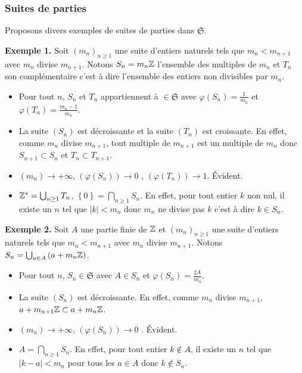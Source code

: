 \subsubsection{Suites de parties}\label{ExplesSuitesCongru}
Proposons divers exemples de suites de parties dans $\mathfrak{S}$.

\textbf{Exemple 1.}\newline
Soit  $(m_n)_{n\geq 1}$ une suite d'entiers naturels tels que $m_n < m_{n+1}$ avec $m_n$ divise $m_{n+1}$.\newline
Notons $S_n = m_n \mathbb{Z}$ l'ensemble des multiples de $m_n$ et $T_n$ son complémentaire c'est à dire l'ensemble des entiers non divisibles par $m_n$.
 \begin{itemize}
  \item Pour tout $n$, $S_n$ et $T_n$ appartiennent à $\in \mathfrak{S}$ avec $\varphi(S_n)=\frac{1}{m_n}$ et $\varphi(T_n)=\frac{m_n-1}{m_n}$.
  \item La suite $(S_n)$ est décroissante et la suite $(T_n)$ est croissante. En effet, comme $m_n$ divise $m_{n+1}$, tout multiple de $m_{n+1}$ est un multiple de $m_{n}$ donc $S_{n+1} \subset S_{n}$ et $T_n \subset T_{n+1}$.
  \item $(m_n) \rightarrow + \infty$, $(\varphi(S_n)) \rightarrow 0$ , $(\varphi(T_n)) \rightarrow 1$. Évident.
  \item $\mathbb{Z}^* = \bigcup_{n\geq 1} T_n$, $\left\lbrace 0 \right\rbrace = \bigcap_{n\geq 1} S_n$. En effet, pour tout entier $k$ non nul, il existe un $n$ tel que $|k| < m_n$ donc $m_n$ ne divise pas $k$ c'est à dire $k \in S_n$.
 \end{itemize}

\textbf{Exemple 2.}\newline
Soit  $A$ une partie finie de $\mathbb{Z}$ et $(m_n)_{n\geq 1}$ une suite d'entiers naturels tels que $m_n < m_{n+1}$ avec $m_n$ divise $m_{n+1}$.\newline
Notons $S_n = \bigcup_{a \in A} \left(a + m_n \mathbb{Z}\right)$.
 \begin{itemize}
  \item Pour tout $n$, $S_n\in \mathfrak{S}$ avec $A \in S_n$ et $\varphi(S_n)=\frac{\sharp A }{m_n}$.
  \item La suite $(S_n)$ est décroissante. En effet, comme $m_n$ divise $m_{n+1}$, $a + m_{n+1}\mathbb{Z} \subset a + m_{n}\mathbb{Z}$.
  \item $(m_n) \rightarrow + \infty$, $(\varphi(S_n)) \rightarrow 0$ . Évident.
  \item $A = \bigcap_{n\geq 1} S_n$. En effet, pour tout entier $k \notin A$, il existe un $n$ tel que $|k -a| < m_n$ pour tous les $a\in A$ donc $k \notin S_n$.
 \end{itemize}

